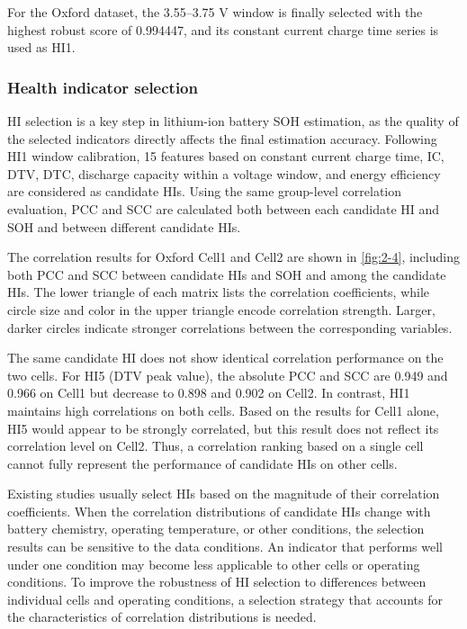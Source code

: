 For the Oxford dataset, the 3.55--3.75 V window is finally selected with the highest robust score of 0.994447, and its constant current charge time series is used as HI1.

\subsubsection{Health indicator selection}

HI selection is a key step in lithium-ion battery SOH estimation\cite{ref64,ref55}, as the quality of the selected indicators directly affects the final estimation accuracy. Following HI1 window calibration, 15 features based on constant current charge time, IC, DTV, DTC, discharge capacity within a voltage window, and energy efficiency are considered as candidate HIs. Using the same group-level correlation evaluation, PCC and SCC are calculated both between each candidate HI and SOH and between different candidate HIs.

The correlation results for Oxford Cell1 and Cell2 are shown in \cref{fig:2-4}, including both PCC and SCC between candidate HIs and SOH and among the candidate HIs. The lower triangle of each matrix lists the correlation coefficients, while circle size and color in the upper triangle encode correlation strength. Larger, darker circles indicate stronger correlations between the corresponding variables.

The same candidate HI does not show identical correlation performance on the two cells. For HI5 (DTV peak value), the absolute PCC and SCC are 0.949 and 0.966 on Cell1 but decrease to 0.898 and 0.902 on Cell2. In contrast, HI1 maintains high correlations on both cells. Based on the results for Cell1 alone, HI5 would appear to be strongly correlated, but this result does not reflect its correlation level on Cell2. Thus, a correlation ranking based on a single cell cannot fully represent the performance of candidate HIs on other cells.

Existing studies usually select HIs based on the magnitude of their correlation coefficients. When the correlation distributions of candidate HIs change with battery chemistry, operating temperature, or other conditions, the selection results can be sensitive to the data conditions. An indicator that performs well under one condition may become less applicable to other cells or operating conditions. To improve the robustness of HI selection to differences between individual cells and operating conditions, a selection strategy that accounts for the characteristics of correlation distributions is needed.

